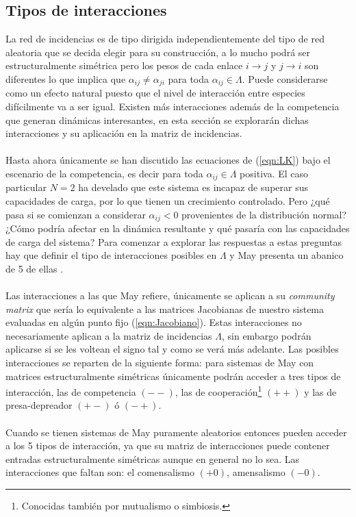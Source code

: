 \subsection{Tipos de interacciones}

La red de incidencias es de tipo dirigida independientemente del tipo de red aleatoria que se decida elegir para su construcción, a lo mucho podrá ser estructuralmente simétrica pero los pesos de cada enlace $i\to j$ y $j\to i$ son diferentes lo que implica que $\alpha_{ij}\neq\alpha_{ji}$ para toda $\alpha_{ij}\in\Lambda$. Puede considerarse como un efecto natural puesto que el nivel de interacción entre especies difícilmente va a ser igual. Existen más interacciones además de la competencia que generan dinámicas interesantes, en esta sección se explorarán dichas interacciones y su aplicación en la matriz de incidencias.
\\
\\
Hasta ahora únicamente se han discutido las ecuaciones de (\ref{eqn:LK}) bajo el escenario de la competencia, es decir para toda $\alpha_{ij}\in\Lambda$ positiva. El caso particular $N=2$ ha develado que este sistema es incapaz de superar sus capacidades de carga, por lo que tienen un crecimiento controlado. Pero ¿qué pasa si se comienzan a considerar $\alpha_{ij}<0$ provenientes de la distribución normal? ¿Cómo podría afectar en la dinámica resultante y qué pasaría con las capacidades de carga del sistema? Para comenzar a explorar las respuestas a estas preguntas hay que definir el tipo de interacciones posibles en $\Lambda$ y May presenta un abanico de 5 de ellas \cite{may2019stability}.\\
\\
Las interacciones a las que May refiere, únicamente se aplican a su \textit{community matrix} que sería lo equivalente a las matrices Jacobianas de nuestro sistema evaluadas en algún punto fijo (\ref{eqn:Jacobiano}). Estas interacciones no necesariamente aplican a la matriz de incidencias $\Lambda$, sin embargo podrán aplicarse  si se les voltean el signo tal y como se verá más adelante. Las posibles interacciones se reparten de la siguiente forma: para sistemas de May con matrices estructuralmente simétricas únicamente podrán acceder a tres tipos de interacción, las de competencia $(--)$, las de cooperación\footnote{Conocidas también por mutualismo o simbiosis.} $(++)$ y las de presa-depreador $(+-)$ ó $(-+)$.
\\
\\
Cuando se tienen sistemas de May puramente aleatorios entonces pueden acceder a los 5 tipos de interacción, ya que su matriz de interacciones puede contener entradas estructuralmente simétricas aunque en general no lo sea. Las interacciones que faltan son: el comensalismo $(+0)$, amensalismo $(-0)$. \\

